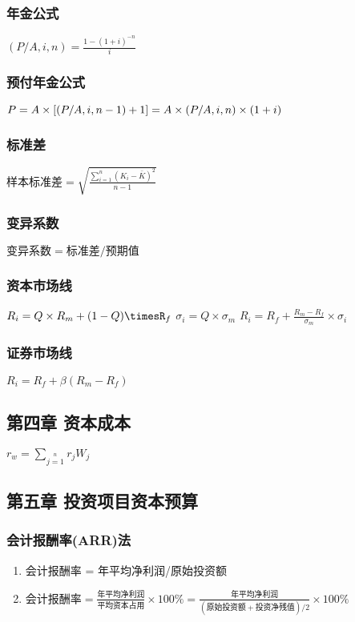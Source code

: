 \documentclass[12pt,a4paper]{article}
\begin{document}
\subsubsection{年金公式}
\label{sec:orgfffcf28}
\((P/A,i,n)=\frac{1-(1+i)^{-n}}{i}\)
\subsubsection{预付年金公式}
\label{sec:org3f785ca}
\(P = A\times [(P/A,i,n-1)+1]\\ = A\times (P/A,i,n)\times (1+i)\)
\subsubsection{标准差}
\label{sec:orgf889aaa}
\(样本标准差=\sqrt{\frac{\sum_{i=1}^{n}(K_{i}-\bar{K})^{2}}{n-1}}\)
\subsubsection{变异系数}
\label{sec:org2b20e70}
\(变异系数 =标准差/预期值\)
\subsubsection{资本市场线}
\label{sec:org0641b4a}
\(R_{i}=Q\times R_{m} +(1-Q)\timesR_{f}\)
\(\sigma_{i}=Q\times \sigma_{m}\)
\(R_{i}=R_{f}+\frac{R_{m}-R_{f}}{\sigma_{m}}\times \sigma_{i}\)
\subsubsection{证券市场线}
\label{sec:org51922f2}
\(R_{i}=R_{f}+\beta(R_{m}-R_{f})\)
\subsection{第四章 资本成本}
\label{sec:orgf008930}
\(r_{w}=\sum_{j=1}\limits^{n}r_{j}W_{j}\)
\subsection{第五章 投资项目资本预算}
\label{sec:org858b891}
\subsubsection{会计报酬率(ARR)法}
\label{sec:orgfa34783}
\begin{enumerate}
\item 会计报酬率 = 年平均净利润/原始投资额
\item \(会计报酬率 = \frac{年平均净利润}{平均资本占用}\times100\% = \frac{年平均净利润}{(原始投资额+投资净残值)/2}\times100\%\)
\end{enumerate}
\end{document}
